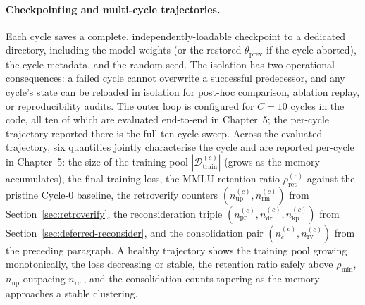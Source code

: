 \paragraph{Checkpointing and multi-cycle trajectories.}
Each cycle saves a complete, independently-loadable checkpoint to a dedicated directory, including the model weights (or the restored $\theta_{\text{prev}}$ if the cycle aborted), the cycle metadata, and the random seed. The isolation has two operational consequences: a failed cycle cannot overwrite a successful predecessor, and any cycle's state can be reloaded in isolation for post-hoc comparison, ablation replay, or reproducibility audits. The outer loop is configured for $C = 10$ cycles in the code, all ten of which are evaluated end-to-end in Chapter~5; the per-cycle trajectory reported there is the full ten-cycle sweep. Across the evaluated trajectory, six quantities jointly characterise the cycle and are reported per-cycle in Chapter~5: the size of the training pool $|\mathcal{D}_{\text{train}}^{(c)}|$ (grows as the memory accumulates), the final training loss, the MMLU retention ratio $\rho_{\text{ret}}^{(c)}$ against the pristine Cycle-0 baseline, the retroverify counters $(n_{\text{up}}^{(c)}, n_{\text{rm}}^{(c)})$ from Section~\ref{sec:retroverify}, the reconsideration triple $(n_{\text{pr}}^{(c)}, n_{\text{dr}}^{(c)}, n_{\text{kp}}^{(c)})$ from Section~\ref{sec:deferred-reconsider}, and the consolidation pair $(n_{\text{cl}}^{(c)}, n_{\text{rv}}^{(c)})$ from the preceding paragraph. A healthy trajectory shows the training pool growing monotonically, the loss decreasing or stable, the retention ratio safely above $\rho_{\min}$, $n_{\text{up}}$ outpacing $n_{\text{rm}}$, and the consolidation counts tapering as the memory approaches a stable clustering.

